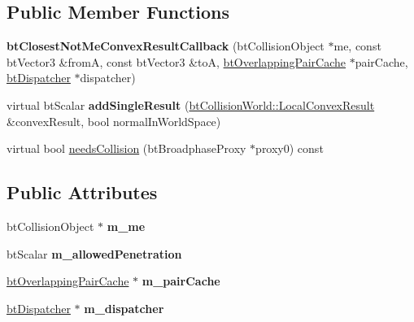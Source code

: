 \subsection*{Public Member Functions}
\begin{DoxyCompactItemize}
\item 
\mbox{\label{classbtClosestNotMeConvexResultCallback_a8f523492c2d42c423e5e346678d5103f}} 
{\bfseries bt\+Closest\+Not\+Me\+Convex\+Result\+Callback} (bt\+Collision\+Object $\ast$me, const bt\+Vector3 \&fromA, const bt\+Vector3 \&toA, \hyperlink{classbtOverlappingPairCache}{bt\+Overlapping\+Pair\+Cache} $\ast$pair\+Cache, \hyperlink{classbtDispatcher}{bt\+Dispatcher} $\ast$dispatcher)
\item 
\mbox{\label{classbtClosestNotMeConvexResultCallback_aa5d0f0efa8bf9810c86fdad74f36b7bd}} 
virtual bt\+Scalar {\bfseries add\+Single\+Result} (\hyperlink{structbtCollisionWorld_1_1LocalConvexResult}{bt\+Collision\+World\+::\+Local\+Convex\+Result} \&convex\+Result, bool normal\+In\+World\+Space)
\item 
virtual bool \hyperlink{classbtClosestNotMeConvexResultCallback_ac6aca2b0d095fc7d4ece514371a9fdf2}{needs\+Collision} (bt\+Broadphase\+Proxy $\ast$proxy0) const
\end{DoxyCompactItemize}
\subsection*{Public Attributes}
\begin{DoxyCompactItemize}
\item 
\mbox{\label{classbtClosestNotMeConvexResultCallback_a2526a2d1fa063b42fa7175a03d7603e1}} 
bt\+Collision\+Object $\ast$ {\bfseries m\+\_\+me}
\item 
\mbox{\label{classbtClosestNotMeConvexResultCallback_ab1a5b3888aab76b6803a6c310e9f6eb0}} 
bt\+Scalar {\bfseries m\+\_\+allowed\+Penetration}
\item 
\mbox{\label{classbtClosestNotMeConvexResultCallback_aaa9c791b053b3b2c844379c2aef14528}} 
\hyperlink{classbtOverlappingPairCache}{bt\+Overlapping\+Pair\+Cache} $\ast$ {\bfseries m\+\_\+pair\+Cache}
\item 
\mbox{\label{classbtClosestNotMeConvexResultCallback_a3731548c868ad4fa35a7905d7ff5a9a6}} 
\hyperlink{classbtDispatcher}{bt\+Dispatcher} $\ast$ {\bfseries m\+\_\+dispatcher}
\end{DoxyCompactItemize}


